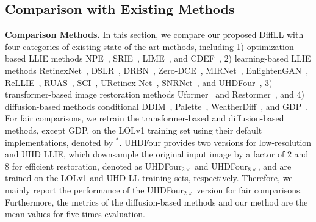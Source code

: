 \subsection{Comparison with Existing Methods}\label{subsec:Comparison with Existing Methods}
\textbf{Comparison Methods.} In this section, we compare our proposed DiffLL with four categories of existing state-of-the-art methods, including 1) optimization-based LLIE methods NPE~\cite{NPE}, SRIE~\cite{SRIE}, LIME~\cite{LIME}, and CDEF~\cite{CDEF}, 2) learning-based LLIE methods RetinexNet~\cite{RetinexNet}, DSLR~\cite{DSLR}, DRBN~\cite{DRBN}, Zero-DCE~\cite{Zero-DCE}, MIRNet~\cite{MIRNet}, EnlightenGAN~\cite{EnlightenGAN}, ReLLIE~\cite{ReLLIE}, RUAS~\cite{RUAS},  SCI~\cite{SCI}, URetinex-Net~\cite{Uretinex-net}, SNRNet~\cite{SNRNet}, and UHDFour~\cite{UHD_ICLR}, 3) transformer-based image restoration methods Uformer~\cite{Uformer} and Restormer~\cite{Restormer}, and 4) diffusion-based methods conditional DDIM~\cite{ddim}, Palette~\cite{palette}, WeatherDiff~\cite{weatherdiff}, and GDP~\cite{GDP}. For fair comparisons, we retrain the transformer-based and diffusion-based methods, except GDP, on the LOLv1 training set using their default implementations, denoted by $^{\ast}$. UHDFour provides two versions for low-resolution and UHD LLIE, which downsample the original input image by a factor of 2 and 8 for efficient restoration, denoted as UHDFour$_{2\times}$ and UHDFour$_{8\times}$, and are trained on the LOLv1 and UHD-LL training sets, respectively. Therefore, we mainly report the performance of the UHDFour$_{2\times}$ version for fair comparisons. Furthermore, the metrics of the diffusion-based methods and our method are the mean values for five times evaluation.

